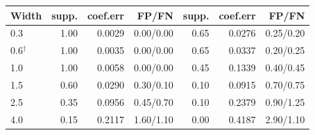 \begin{tabular}{lrrrrrr}\toprule
Width & supp. & coef.err & FP/FN & supp. & coef.err & FP/FN \\\midrule
0.3 & 1.00 & 0.0029 & 0.00/0.00 & 0.65 & 0.0276 & 0.25/0.20 \\
0.6$^\dagger$ & 1.00 & 0.0035 & 0.00/0.00 & 0.65 & 0.0337 & 0.20/0.25 \\
1.0 & 1.00 & 0.0058 & 0.00/0.00 & 0.45 & 0.1339 & 0.40/0.45 \\
1.5 & 0.60 & 0.0290 & 0.30/0.10 & 0.10 & 0.0915 & 0.70/0.75 \\
2.5 & 0.35 & 0.0956 & 0.45/0.70 & 0.10 & 0.2379 & 0.90/1.25 \\
4.0 & 0.15 & 0.2117 & 1.60/1.10 & 0.00 & 0.4187 & 2.90/1.10 \\
\bottomrule\end{tabular}

